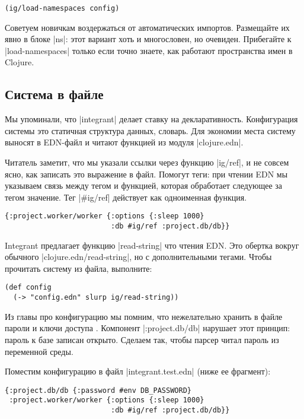 \begin{verbatim}
(ig/load-namespaces config)
\end{verbatim}

Советуем новичкам воздержаться от автоматических импортов. Размещайте их явно в
блоке \spverb|ns|: этот вариант хоть и многословен, но очевиден. Прибегайте к
\spverb|load-namespaces| только если точно знаете, как работают пространства
имен в Clojure.

\subsection{Система в файле}

Мы упоминали, что \spverb|integrant| делает ставку на
декларативность. Конфигурация системы это статичная структура данных,
словарь. Для экономии места систему выносят в EDN-файл и читают функцией из
модуля \spverb|clojure.edn|.

Читатель заметит, что мы указали ссылки через функцию \spverb|ig/ref|, и не
совсем ясно, как записать это выражение в файл. Помогут теги: при чтении EDN мы
указываем связь между тегом и функцией, которая обработает следующее за тегом
значение. Тег \spverb|#ig/ref| действует как одноименная функция.

\begin{verbatim}
{:project.worker/worker {:options {:sleep 1000}
                         :db #ig/ref :project.db/db}}
\end{verbatim}

Integrant предлагает функцию \spverb|read-string| что чтения EDN. Это обертка
вокруг обычного \spverb|clojure.edn/read-string|, но с дополнительными
тегами. Чтобы прочитать систему из файла, выполните:

\begin{verbatim}
(def config
  (-> "config.edn" slurp ig/read-string))
\end{verbatim}

Из главы про конфигурацию мы помним, что нежелательно хранить в файле пароли и
ключи доступа . Компонент \spverb|:project.db/db| нарушает
этот принцип: пароль к базе записан открыто. Сделаем так, чтобы парсер читал
пароль из переменной среды.

Поместим конфигурацию в файл \spverb|integrant.test.edn| (ниже ее фрагмент):

\begin{verbatim}
{:project.db/db {:password #env DB_PASSWORD}
 :project.worker/worker {:options {:sleep 1000}
                         :db #ig/ref :project.db/db}}
\end{verbatim}

